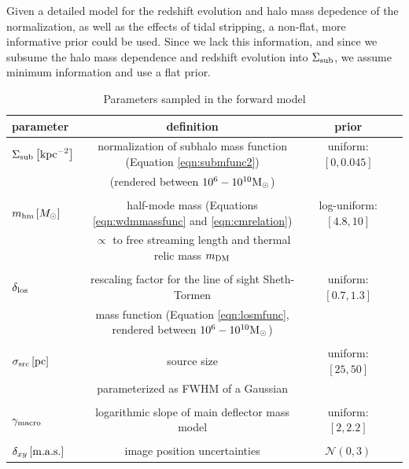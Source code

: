 Given a detailed model for the redshift evolution and halo mass depedence of the normalization, as well as the effects of tidal stripping, a non-flat, more informative prior could be used. Since we lack this information, and since we subsume the halo mass dependence and redshift evolution into $\Sigma_{\rm{sub}}$, we assume minimum information and use a flat prior.
\begin{landscape}
\begin{table}
	\centering
	\caption[Summary of model parameters]{Parameters sampled in the forward model}
	\label{tab:params}
	\begin{tabular}{lccr} %
		\hline
		parameter & definition & prior\\
		\hline 
		$\Sigma_{\rm{sub}} \left[\rm{kpc}^{-2}\right]$ & normalization of subhalo mass function (Equation \ref{eqn:submfunc2})&  uniform: $\left[0, 0.045\right] $\\&(rendered between $10^6-10^{10} {\rm{M}_{\odot}}$) & \\
		\\
		${m_{\rm{hm}}} \left[M_{\odot}\right]$ & half-mode mass (Equations \ref{eqn:wdmmassfunc} and \ref{eqn:cmrelation})& log-uniform: $\left[4.8, 10\right] $ \\
		&$\propto$ to free streaming length and thermal relic mass $m_{\rm{DM}}$ &\\
		\\
		$\delta_{\rm{los}}$ & rescaling factor for the line of sight Sheth-Tormen & uniform: $\left[0.7, 1.3\right]$ \\
		&mass function (Equation \ref{eqn:losmfunc}, rendered between $10^6-10^{10} {\rm{M}_{\odot}}$)&\\
		\\
		$\sigma_{\rm{src}} \left[\rm{pc}\right]$ & source size& uniform: $\left[25, 50\right]$\\
		& parameterized as FWHM of a Gaussian &\\
		\\
		$\gamma_{\rm{macro}}$ & logarithmic slope of main deflector mass model  & uniform: $\left[2, 2.2\right]$\\
		\\
		$\delta_{xy} \left[\rm{m.a.s.}\right]$ & image position uncertainties& ${\mathcal{N}}\left(0, 3\right)$\\
		\hline		
		
	\end{tabular}
\end{table}
\end{landscape}
